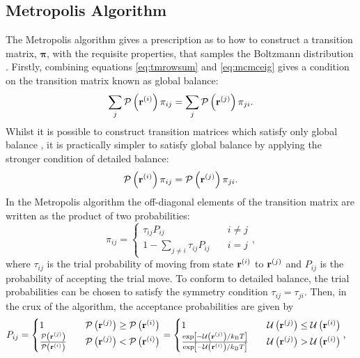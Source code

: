 \subsection{Metropolis Algorithm}
\label{ssec:metropolis}

The Metropolis algorithm gives a prescription as to how to construct a transition matrix, $\bm{\pi}$, with the requisite properties, that samples the Boltzmann distribution \cite{Metropolis1953}.
Firstly, combining equations \eqref{eq:tmrowsum} and \eqref{eq:mcmceig} gives a condition on the transition matrix known as global balance:
\begin{equation}
	\sum_j \mathcal{P}\left(\mathbf{r}^{\left(i\right)}\right)\pi_{ij} = \sum_j \mathcal{P}\left(\mathbf{r}^{\left(j\right)}\right)\pi_{ji}.
\end{equation} 
Whilst it is possible to construct transition matrices which satisfy only global balance \cite{Manousiouthakis1999,Suwa2010,Michel2014}, it is practically simpler to satisfy global balance by applying the stronger condition of detailed balance:
\begin{equation}
	\mathcal{P}\left(\mathbf{r}^{\left(i\right)}\right)\pi_{ij} = \mathcal{P}\left(\mathbf{r}^{\left(j\right)}\right)\pi_{ji}.
\end{equation}
In the Metropolis algorithm the off\--diagonal elements of the transition matrix are written as the product of two probabilities: 
\begin{equation}
	\pi_{ij} = \begin{cases} 
		\tau_{ij}P_{ij} \quad & i\neq j \\
		1-\sum\limits_{j\neq i}\tau_{ij}P_{ij} \quad & i=j
	\end{cases},
\end{equation}
where $\tau_{ij}$ is the trial probability of moving from state $\mathbf{r}^{\left(i\right)}$ to $\mathbf{r}^{\left(j\right)}$ and $P_{ij}$ is the probability of accepting the trial move.
To conform to detailed balance, the trial probabilities can be chosen to satisfy the symmetry condition $\tau_{ij}=\tau_{ji}$.
Then, in the crux of the algorithm, the acceptance probabilities are given by
\begin{align}
	 P_{ij}&=\begin{cases}
	 	1 \quad &\mathcal{P}\left(\vrc{j}\right)\geq \mathcal{P}\left(\vrc{i}\right) \\
	 	\frac{\mathcal{P}\left(\vrc{j}\right)}{\mathcal{P}\left(\vrc{i}\right)} \quad & \mathcal{P}\left(\vrc{j}\right)< \mathcal{P}\left(\vrc{i}\right)
	 \end{cases}%
	 =\begin{cases}
	 	1 \quad &\mathcal{U}\left(\vrc{j}\right)\leq \mathcal{U}\left(\vrc{i}\right) \\
	 	\frac{\exp\left[-\mathcal{U}\left(\vrc{j}\right)/\kb T\right]}{\exp\left[-\mathcal{U}\left(\vrc{i}\right)/\kb T\right]} \quad & \mathcal{U}\left(\vrc{j}\right)>\mathcal{U}\left(\vrc{i}\right)
	 \end{cases}, \nonumber
\end{align}
